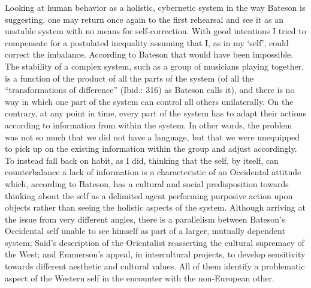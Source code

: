 \documentclass[a4paper]{article}
\begin{document}
Looking at human behavior as a holistic, cybernetic system in the way Bateson is suggesting, one may return once again to the first rehearsal and see it as an unstable system with no means for self-correction. With good intentions I tried to compensate for a postulated inequality assuming that I, as in my `self', could correct the imbalance. According to Bateson that would have been impossible. The stability of a complex system, such as a group of musicians playing together, is a function of the product of all the parts of the system (of all the ``transformations of difference'' (Ibid.: 316) as Bateson calls it), and there is no way in which one part of the system can control all others unilaterally. On the contrary, at any point in time, every part of the system has to adapt their actions according to information from within the system. In other words, the problem was not so much that we did not have a language, but that we were unequipped to pick up on the existing information within the group and adjust accordingly. To instead fall back on habit, as I did, thinking that the self, by itself, can counterbalance a lack of information is a characteristic of an Occidental attitude which, according to Bateson, has a cultural and social predisposition towards thinking about the self as a delimited agent performing purposive action upon objects rather than seeing the holistic aspects of the system. Although arriving at the issue from very different angles, there is a parallelism between Bateson's Occidental self unable to see himself as part of a larger, mutually dependent system; Said's description of the Orientalist reasserting the cultural supremacy of the West; and Emmerson's appeal, in intercultural projects, to develop sensitivity towards different aesthetic and cultural values. All of them identify a problematic aspect of the Western self in the encounter with the non-European other. 
\end{document}
